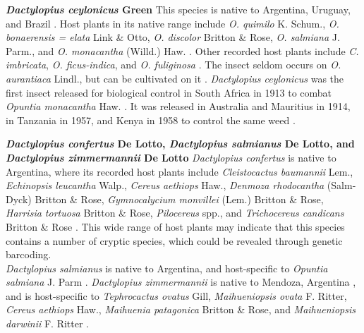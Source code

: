 \noindent \textbf{\textit{Dactylopius ceylonicus} Green} \newline   
This species is native to Argentina, Uruguay, and Brazil \citep{Mann1969Cactus-feedingMites}. Host plants in its native range include \textit{O. quimilo} K. Schum., \textit{O. bonaerensis = elata} Link \& Otto, \textit{O. discolor} Britton \& Rose, \textit{O. salmiana} J. Parm., and \textit{O. monacantha} (Willd.) Haw. \citep{Mann1969Cactus-feedingMites}. Other recorded host plants include \textit{C. imbricata}, \textit{O. ficus-indica}, and \textit{O. fuliginosa} \citep{Chavez-Moreno2011DistributionOpuntioideae}. The insect seldom occurs on \textit{O. aurantiaca} Lindl., but can be cultivated on it \citep{Mann1969Cactus-feedingMites}.
\textit{Dactylopius ceylonicus} was the first insect released for biological control in South Africa in 1913 to combat \textit{Opuntia monacantha} Haw. \citep{Zimmermann2004BiologicalWater}. It was released in Australia and Mauritius in 1914, in Tanzania in 1957, and Kenya in 1958 to control the same weed \citep{Winston2014BiologicalWeeds.}. \newline 

\noindent \textbf{\textit{Dactylopius confertus} De Lotto, \textit{Dactylopius salmianus} De Lotto, and \textit{Dactylopius zimmermannii} De Lotto} \newline  
\textit{Dactylopius confertus} is native to Argentina, where its recorded host plants include \textit{Cleistocactus baumannii} Lem., \textit{Echinopsis leucantha} Walp., \textit{Cereus aethiops} Haw., \textit{Denmoza rhodocantha} (Salm-Dyck) Britton \& Rose, \textit{Gymnocalycium monvillei} (Lem.) Britton \& Rose, \textit{Harrisia tortuosa} Britton \& Rose, \textit{Pilocereus} spp., and \textit{Trichocereus candicans} Britton \& Rose \citep{Claps2001CoccoideaArgentina}. This wide range of host plants may indicate that this species contains a number of cryptic species, which could be revealed through genetic barcoding. \\
\textit{Dactylopius salmianus} is native to Argentina, and host-specific to \textit{Opuntia salmiana} J. Parm \citep{Perez-Guerra1992}. \textit{Dactylopius zimmermannii} is native to Mendoza, Argentina \citep{Perez-Guerra1992}, and is host-specific to \textit{Tephrocactus ovatus} Gill, \textit{Maihueniopsis ovata} F. Ritter, \textit{Cereus aethiops} Haw., \textit{Maihuenia patagonica} Britton \& Rose, and \textit{Maihueniopsis darwinii} F. Ritter \citep{Claps2001CoccoideaArgentina}.

